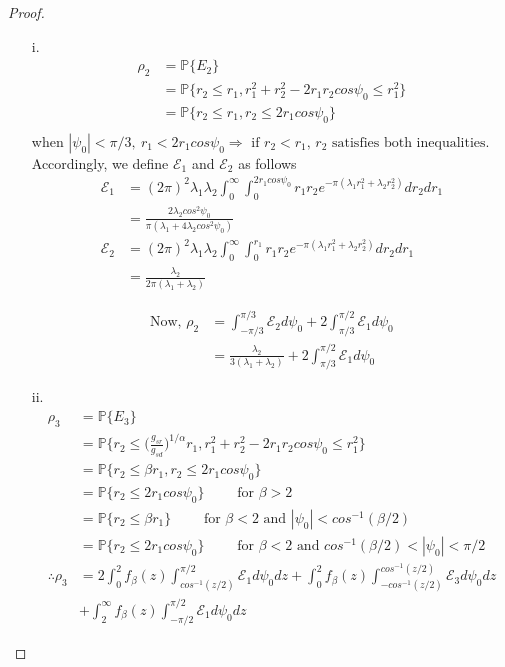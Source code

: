 \begin{proof}
\begin{itemize}
\item[i.] 
\begin{align*}
\rho_2 &= \mathbb{P}\{E_2\} \\
&= \mathbb{P}\{r_2 \leq r_1, r_1^2+r_2^2-2r_1r_2cos\psi_0 \leq r_1^2\} \\
&= \mathbb{P}\{r_2 \leq r_1, r_2 \leq 2 r_1 cos\psi_0 \} \\
\end{align*}
when $|\psi_0|<\pi/3, ~ r_1 < 2r_1cos\psi_0  \Rightarrow \text{ if } r_2 < r_1 \text{, $r_2$ satisfies both inequalities.}$ Accordingly, we define $\mathcal{E}_1$ and $\mathcal{E}_2$ as follows
\begin{align*}
\mathcal{E}_1 &= (2\pi)^2\lambda_1 \lambda_2 \int_0^\infty \int_0^{2r_1 cos\psi_0}r_1r_2e^{-\pi(\lambda_1 r_1^2 + \lambda_2 r_2^2)}dr_2 dr_1 \\
&= \frac{2\lambda_2 cos^2\psi_0}{\pi(\lambda_1+4\lambda_2cos^2\psi_0)} \\
\mathcal{E}_2 &= (2\pi)^2\lambda_1 \lambda_2 \int_0^\infty \int_0^{r_1}r_1r_2e^{-\pi(\lambda_1 r_1^2 + \lambda_2 r_2^2)}dr_2 dr_1 \\
&= \frac{\lambda_2}{2\pi(\lambda_1+\lambda_2)}
\end{align*}
 
\begin{align*}
\text{Now, }\rho_2 &= \int_{-\pi/3}^{\pi/3} \mathcal{E}_2 d\psi_0 + 2\int_{\pi/3}^{\pi/2} \mathcal{E}_1d\psi_0 \\
&=  \frac{\lambda_2}{3(\lambda_1+\lambda_2)} + 2\int_{\pi/3}^{\pi/2} \mathcal{E}_1d\psi_0
\end{align*} 

\item[ii.]
\begin{align}
\rho_3 &= \mathbb{P}\{E_3\} \\
&= \mathbb{P}\{r_2 \leq \bigg(\frac{g_{sr}}{g_{sd}} \bigg)^{1/\alpha}r_1, r_1^2+r_2^2-2r_1r_2cos\psi_0 \leq r_1^2\} \\
&= \mathbb{P}\{r_2 \leq \beta r_1, r_2 \leq 2 r_1 cos\psi_0 \} \\
&= \mathbb{P}\{r_2 \leq 2 r_1 cos\psi_0 \} \qquad \text{ for } \beta > 2 \\
&= \mathbb{P}\{r_2 \leq \beta r_1\} \qquad \text{ for } \beta < 2  \text{ and } |\psi_0| < cos^{-1}(\beta/2) \\
&= \mathbb{P}\{r_2 \leq 2 r_1 cos\psi_0 \} \qquad \text{ for } \beta < 2 \text{ and } cos^{-1}(\beta/2) < |\psi_0| <  \pi/2 \\
\therefore \rho_3&= 2 \int_0^2 f_{\beta}(z)\int^{\pi/2}_{cos^{-1}(z/2)}\mathcal{E}_1 d\psi_0 dz +\int_0^2 f_{\beta}(z)\int_{-cos^{-1}(z/2)}^{cos^{-1}(z/2)}\mathcal{E}_3 d\psi_0dz \\&+ \int_2^{\infty} f_{\beta}(z)\int_{-\pi/2}^{\pi/2}\mathcal{E}_1 d\psi_0 dz \label{eq:corrected}
\end{align}


\end{itemize}
\end{proof}
